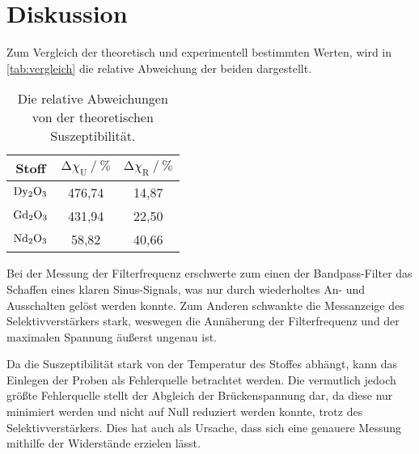 \section{Diskussion}
\label{sec:Diskussion}

Zum Vergleich der theoretisch und experimentell bestimmten Werten, 
wird in \autoref{tab:vergleich} die relative Abweichung der beiden dargestellt.
\begin{table}
    \centering
    \caption{Die relative Abweichungen von der theoretischen Suszeptibilität.}
    \label{tab:vergleich}
    \begin{tabular}{c c c}
        \toprule
        Stoff &  
        $\increment \chi_\text{U} \mathbin{/} \%$ & 
        $\increment \chi_\text{R} \mathbin{/} \%$ \\
        \midrule
        $\ce{Dy2O3}$ &   476,74 &    14,87 \\
        $\ce{Gd2O3}$ &   431,94 &    22,50 \\
        $\ce{Nd2O3}$ &    58,82 &    40,66 \\
        \bottomrule
    \end{tabular}
\end{table}

Bei der Messung der Filterfrequenz erschwerte zum einen der Bandpass-Filter das Schaffen eines klaren Sinus-Signals, 
was nur durch wiederholtes An- und Ausschalten gelöst werden konnte.
Zum Anderen schwankte die Messanzeige des Selektivverstärkers stark, 
weswegen die Annäherung der Filterfrequenz und der maximalen Spannung äußerst ungenau ist.

Da die Suszeptibilität stark von der Temperatur des Stoffes abhängt, kann das Einlegen der Proben als Fehlerquelle betrachtet werden.
Die vermutlich jedoch größte Fehlerquelle stellt der Abgleich der Brückenspannung dar, 
da diese nur minimiert werden und nicht auf Null reduziert werden konnte, trotz des Selektivverstärkers. 
Dies hat auch als Ursache, dass sich eine genauere Messung mithilfe der Widerstände erzielen lässt.